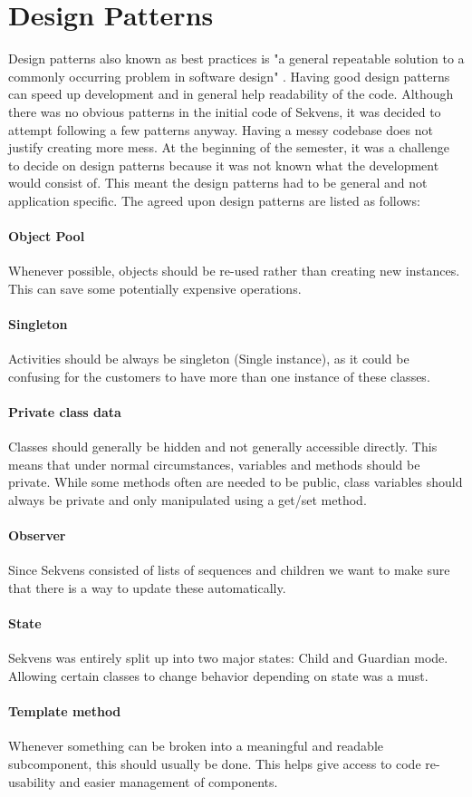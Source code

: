 \section{Design Patterns}\label{spr1_design_patterns}
Design patterns also known as best practices is "a general repeatable solution to a commonly occurring problem in software design" \citep{DesignPatterns}. Having good design patterns can speed up development and in general help readability of the code.
Although there was no obvious patterns in the initial code of Sekvens, it was decided to attempt following a few patterns anyway. Having a messy codebase does not justify creating more mess.
At the beginning of the semester, it was a challenge to decide on design patterns because it was not known what the development would consist of. This meant the design patterns had to be general and not application specific. The agreed upon design patterns are listed as follows:

\paragraph{Object Pool}
Whenever possible, objects should be re-used rather than creating new instances. This can save some potentially expensive operations.

\paragraph{Singleton}
Activities should be always be singleton (Single instance), as it could be confusing for the customers to have more than one instance of these classes.

\paragraph{Private class data}
Classes should generally be hidden and not generally accessible directly. This means that under normal circumstances, variables and methods should be private. While some methods often are needed to be public, class variables should always be private and only manipulated using a get/set method.

\paragraph{Observer}
Since Sekvens consisted of lists of sequences and children we want to make sure that there is a way to update these automatically.

\paragraph{State}
Sekvens was entirely split up into two major states: Child and Guardian mode. Allowing certain classes to change behavior depending on state was a must.

\paragraph{Template method}
Whenever something can be broken into a meaningful and readable subcomponent, this should usually be done. This helps give access to code re-usability and easier management of components.
